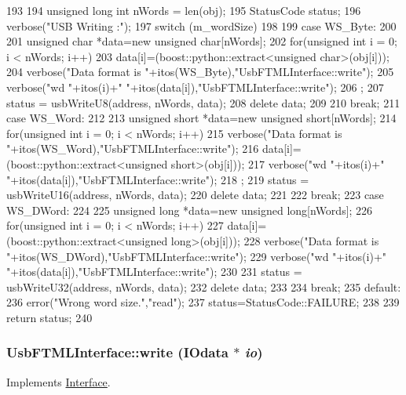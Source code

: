 \begin{DoxyCode}
193 {
194   unsigned long int nWords = len(obj);
195   StatusCode status;
196   verbose("USB Writing :");
197   switch (m_wordSize)
198   {
199   case WS_Byte:
200     {  
201       unsigned char *data=new unsigned char[nWords];
202       for(unsigned int i = 0; i < nWords; i++){
203         data[i]=(boost::python::extract<unsigned char>(obj[i]));
204         verbose("Data format is "+itos(WS_Byte),"UsbFTMLInterface::write");
205         verbose("wd "+itos(i)+" "+itos(data[i]),"UsbFTMLInterface::write");
206       };
207       status = usbWriteU8(address, nWords, data);
208       delete data;
209     }
210     break;
211   case WS_Word:
212     { 
213       unsigned short *data=new unsigned short[nWords];
214       for(unsigned int i = 0; i < nWords; i++){
215         verbose("Data format is "+itos(WS_Word),"UsbFTMLInterface::write");
216         data[i]=(boost::python::extract<unsigned short>(obj[i]));
217         verbose("wd "+itos(i)+" "+itos(data[i]),"UsbFTMLInterface::write");
218       };
219       status = usbWriteU16(address, nWords, data);
220       delete data;
221     }
222     break;
223   case WS_DWord:
224     {
225       unsigned long *data=new unsigned long[nWords];
226       for(unsigned int i = 0; i < nWords; i++){
227         data[i]=(boost::python::extract<unsigned long>(obj[i]));
228         verbose("Data format is "+itos(WS_DWord),"UsbFTMLInterface::write");
229         verbose("wd "+itos(i)+" "+itos(data[i]),"UsbFTMLInterface::write");
230       }    
231       status = usbWriteU32(address, nWords, data);
232       delete data;
233     }
234     break;
235   default:
236     error("Wrong word size.","read");
237     status=StatusCode::FAILURE;
238   }
239   return status;
240 }
\end{DoxyCode}
\hypertarget{classUsbFTMLInterface_aa801e8875661d73b2afe25cb1fb94a94}{
\subsubsection[{write}]{ UsbFTMLInterface::write ({\bf IOdata} $\ast$ {\em io})}}
\label{classUsbFTMLInterface_aa801e8875661d73b2afe25cb1fb94a94}


Implements \hyperlink{classInterface_ad665cacbaf490a26c1c4ba192022e68a}{Interface}.

